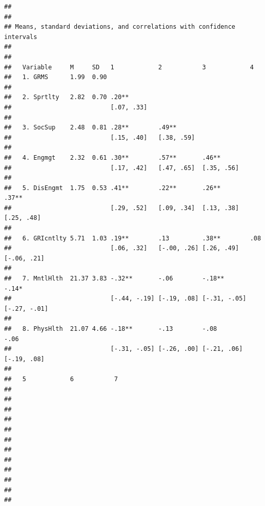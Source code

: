 \documentclass[
  11pt,
]{book}
\begin{document}
\begin{verbatim}
## 
## 
## Means, standard deviations, and correlations with confidence intervals
##  
## 
##   Variable     M     SD   1            2           3            4           
##   1. GRMS      1.99  0.90                                                   
##                                                                             
##   2. Sprtlty   2.82  0.70 .20**                                             
##                           [.07, .33]                                        
##                                                                             
##   3. SocSup    2.48  0.81 .28**        .49**                                
##                           [.15, .40]   [.38, .59]                           
##                                                                             
##   4. Engmgt    2.32  0.61 .30**        .57**       .46**                    
##                           [.17, .42]   [.47, .65]  [.35, .56]               
##                                                                             
##   5. DisEngmt  1.75  0.53 .41**        .22**       .26**        .37**       
##                           [.29, .52]   [.09, .34]  [.13, .38]   [.25, .48]  
##                                                                             
##   6. GRIcntlty 5.71  1.03 .19**        .13         .38**        .08         
##                           [.06, .32]   [-.00, .26] [.26, .49]   [-.06, .21] 
##                                                                             
##   7. MntlHlth  21.37 3.83 -.32**       -.06        -.18**       -.14*       
##                           [-.44, -.19] [-.19, .08] [-.31, -.05] [-.27, -.01]
##                                                                             
##   8. PhysHlth  21.07 4.66 -.18**       -.13        -.08         -.06        
##                           [-.31, -.05] [-.26, .00] [-.21, .06]  [-.19, .08] 
##                                                                             
##   5            6           7         
##                                      
##                                      
##                                      
##                                      
##                                      
##                                      
##                                      
##                                      
##                                      
##                                      
##                                      
##                                      

\end{verbatim}
\end{document}
